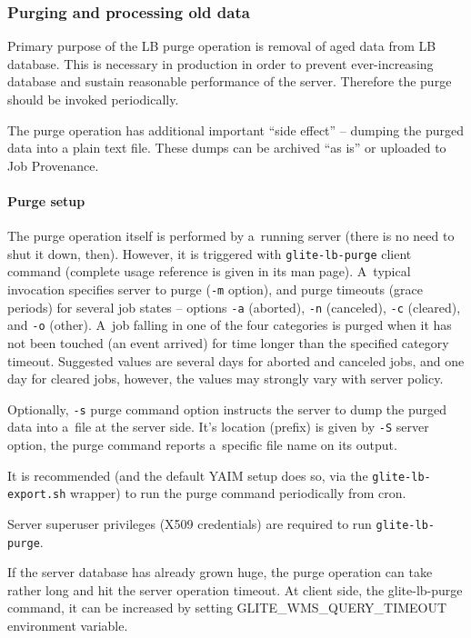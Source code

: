 \subsubsection{Purging and processing old data}
\label{run:purge}

Primary purpose of the LB purge operation  is removal of aged data from LB database. This is necessary in
production in order to prevent ever-increasing database and sustain reasonable
performance of the server. Therefore the purge should be invoked periodically.

The purge operation has additional important ``side effect'' -- dumping the
purged data into a plain text file. These dumps can be archived ``as is'' or
uploaded to Job Provenance. 

\paragraph{Purge setup}

The purge operation itself is performed by a~running \LB server
(there is no need to shut it down, then).
However, it is triggered with \verb'glite-lb-purge' client command
(complete usage reference is given in its man page).
A~typical invocation specifies \LB server to purge (\verb'-m' option),
and purge timeouts (grace periods) for several job states -- options
\verb'-a' (aborted), \verb'-n' (canceled), \verb'-c' (cleared), and
\verb'-o' (other).
A~job falling in one of the four categories is purged when it has not been
touched (\ie an event arrived) for time longer than the specified category
timeout.
Suggested values are several days for aborted and canceled jobs,
and one day for cleared jobs, however, the values may strongly vary
with \LB server policy.

Optionally, \verb'-s' purge command option instructs the server to
dump the purged data into a~file at the server side.
It's location (prefix) is given by \verb'-S' server option,
the purge command reports a~specific file name on its output.

It is recommended (and the default YAIM setup does so, via
the \verb'glite-lb-export.sh' wrapper) to run the purge
command periodically from cron.

Server superuser privileges (X509 credentials) are required to run \verb'glite-lb-purge'.

If the server database has already grown huge, the purge operation can take
rather long and hit the \LB server operation timeout. At client side, \ie the
glite-lb-purge command, it can be increased by setting GLITE\_WMS\_QUERY\_TIMEOUT
environment variable.

